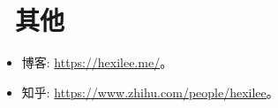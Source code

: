 \documentclass{resume}
\begin{document}
\section{\texorpdfstring{\faInfo}{}\ 其他}
\begin{itemize}[parsep=0.25ex]
  \item 博客: \url{https://hexilee.me/}。
  \item 知乎: \url{https://www.zhihu.com/people/hexilee}。
\end{itemize}
\end{document}
